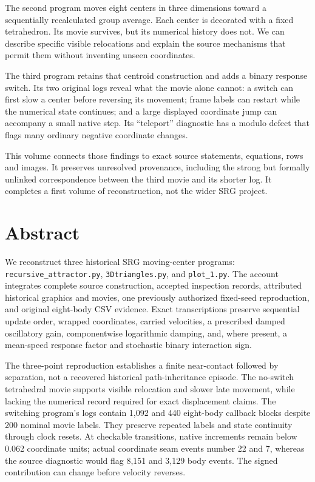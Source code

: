 \documentclass[11pt,a4paper,oneside]{report}
\newcommand{\filepath}[1]{\nolinkurl{#1}}
\begin{document}
The second program moves eight centers in three dimensions toward a
sequentially recalculated group average. Each center is decorated with a fixed
tetrahedron. Its movie survives, but its numerical history does not. We can
describe specific visible relocations and explain the source mechanisms that
permit them without inventing unseen coordinates.

The third program retains that centroid construction and adds a binary response
switch. Its two original logs reveal what the movie alone cannot: a switch can
first slow a center before reversing its movement; frame labels can restart
while the numerical state continues; and a large displayed coordinate jump
can accompany a small native step. Its “teleport” diagnostic has a modulo
defect that flags many ordinary negative coordinate changes.

This volume connects those findings to exact source statements, equations,
rows and images. It preserves unresolved provenance, including the strong but
formally unlinked correspondence between the third movie and its shorter log.
It completes a first volume of reconstruction, not the wider SRG project.

\chapter*{Abstract}
We reconstruct three historical SRG moving-center programs:
\filepath{recursive_attractor.py}, \filepath{3Dtriangles.py}, and
\filepath{plot_1.py}. The account integrates complete source construction,
accepted inspection records, attributed historical graphics and movies, one
previously authorized fixed-seed reproduction, and original eight-body CSV
evidence. Exact transcriptions preserve sequential update order, wrapped
coordinates, carried velocities, a prescribed damped oscillatory gain,
componentwise logarithmic damping, and, where present, a mean-speed response
factor and stochastic binary interaction sign.

The three-point reproduction establishes a finite near-contact followed by
separation, not a recovered historical path-inheritance episode. The
no-switch tetrahedral movie supports visible relocation and slower late
movement, while lacking the numerical record required for exact displacement
claims. The switching program's logs contain 1,092 and 440 eight-body callback
blocks despite 200 nominal movie labels. They preserve repeated labels and
state continuity through clock resets. At checkable transitions, native
increments remain below 0.062 coordinate units; actual coordinate seam events
number 22 and 7, whereas the source diagnostic would flag 8,151 and 3,129 body
events. The signed contribution can change before velocity reverses.
\end{document}
